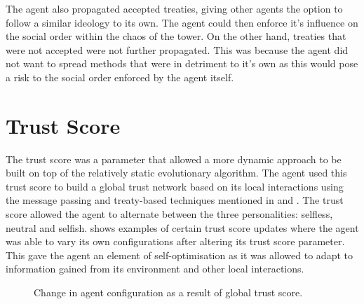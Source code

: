 The agent also propagated accepted treaties, giving other agents the option to follow a similar ideology to its own. The agent could then enforce it's influence on the social order within the chaos of the tower. On the other hand, treaties that were not accepted were not further propagated. This was because the agent did not want to spread methods that were in detriment to it's own as this would pose a risk to the social order enforced by the agent itself.

\section{Trust Score}
The trust score was a parameter that allowed a more dynamic approach to be built on top of the relatively static evolutionary algorithm. The agent used this trust score to build a global trust network based on its local interactions using the message passing and treaty-based techniques mentioned in  and . The trust score allowed the agent to alternate between the three personalities: selfless, neutral and selfish.  shows examples of certain trust score updates where the agent was able to vary its own configurations after altering its trust score parameter. This gave the agent an element of self-optimisation as it was allowed to adapt to information gained from its environment and other local interactions. 

\begin{figure}[htb]%
    \centering
    \qquad
    \caption{Change in agent configuration as a result of global trust score.}%
    \label{fig:team4updateHP}%
\end{figure}

